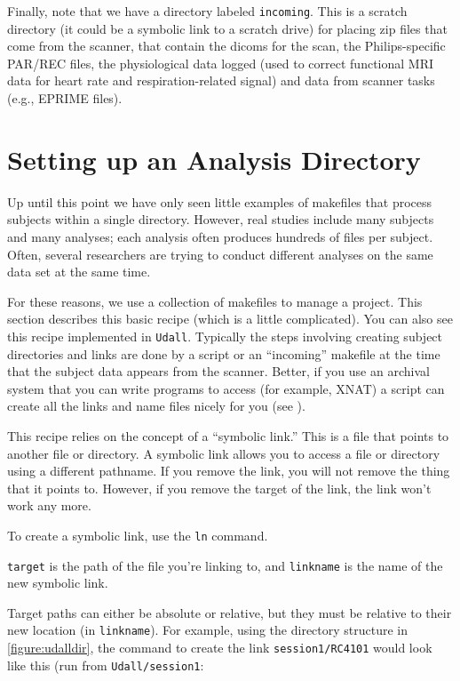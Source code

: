 Finally, note that we have a directory labeled \texttt{incoming}. This is a scratch directory (it could be a symbolic link to a scratch drive) for placing zip files that come from the scanner, that contain the dicoms for the scan, the Philips-specific PAR/REC files, the physiological data logged (used to correct functional MRI data for heart rate and respiration-related signal) and data from scanner tasks (e.g., EPRIME files).

\section{Setting up an Analysis Directory}
\label{sec:analysisdir}

Up until this point we have only seen little examples of makefiles that process subjects within a single directory. However, real studies include many subjects and many analyses; each analysis often produces hundreds of files per subject. Often, several researchers are trying to conduct different analyses on the same data set at the same time.

For these reasons, we use a collection of makefiles to manage a project. This section describes this basic recipe (which is a little complicated). You can also see this recipe implemented in \texttt{Udall}. Typically the steps involving creating subject directories and links are done by a script or an ``incoming'' makefile at the time that the subject data appears from the scanner. Better, if you use an archival system that you can write programs to access (for example, XNAT) a script can create all the links and name files nicely for you (see ). %

This recipe relies on the concept of a ``symbolic link.'' This is a file that points to another file or directory. A symbolic link allows you to access a file or directory using a different pathname. If you remove the link, you will not remove the thing that it points to. However, if you remove the target of the link, the link won't work any more. 

To create a symbolic link, use the \texttt{ln} command.

\texttt{target} is the path of the file you're linking to, and \texttt{linkname} is the name of the new symbolic link.

Target paths can either be absolute or relative, but they must be relative to their new location (in \texttt{linkname}). For example, using the directory structure in \autoref{figure:udalldir}, the command to create the link \texttt{session1/RC4101} would look like this (run from \texttt{Udall/session1}:



